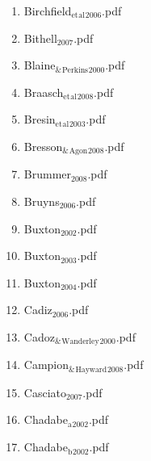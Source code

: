 \documentclass[11pt]{article}
\begin{document}
\begin{enumerate}
\begin{enumerate}
\item Birchfield$_{\text{et}}$$_{\text{al}}$$_{\text{2006}}$.pdf
\label{sec-1-1-1-1-11-19-17-15}

\item Bithell$_{\text{2007}}$.pdf
\label{sec-1-1-1-1-11-19-17-16}

\item Blaine$_{\text{\&}}$$_{\text{Perkins}}$$_{\text{2000}}$.pdf
\label{sec-1-1-1-1-11-19-17-17}

\item Braasch$_{\text{et}}$$_{\text{al}}$$_{\text{2008}}$.pdf
\label{sec-1-1-1-1-11-19-17-18}

\item Bresin$_{\text{et}}$$_{\text{al}}$$_{\text{2003}}$.pdf
\label{sec-1-1-1-1-11-19-17-19}

\item Bresson$_{\text{\&}}$$_{\text{Agon}}$$_{\text{2008}}$.pdf
\label{sec-1-1-1-1-11-19-17-20}

\item Brummer$_{\text{2008}}$.pdf
\label{sec-1-1-1-1-11-19-17-21}

\item Bruyns$_{\text{2006}}$.pdf
\label{sec-1-1-1-1-11-19-17-22}

\item Buxton$_{\text{2002}}$.pdf
\label{sec-1-1-1-1-11-19-17-23}

\item Buxton$_{\text{2003}}$.pdf
\label{sec-1-1-1-1-11-19-17-24}

\item Buxton$_{\text{2004}}$.pdf
\label{sec-1-1-1-1-11-19-17-25}

\item Cadiz$_{\text{2006}}$.pdf
\label{sec-1-1-1-1-11-19-17-26}

\item Cadoz$_{\text{\&}}$$_{\text{Wanderley}}$$_{\text{2000}}$.pdf
\label{sec-1-1-1-1-11-19-17-27}

\item Campion$_{\text{\&}}$$_{\text{Hayward}}$$_{\text{2008}}$.pdf
\label{sec-1-1-1-1-11-19-17-28}

\item Casciato$_{\text{2007}}$.pdf
\label{sec-1-1-1-1-11-19-17-29}

\item Chadabe$_{\text{a}}$$_{\text{2002}}$.pdf
\label{sec-1-1-1-1-11-19-17-30}

\item Chadabe$_{\text{b}}$$_{\text{2002}}$.pdf
\label{sec-1-1-1-1-11-19-17-31}


\end{enumerate}
\end{enumerate}
\end{document}
